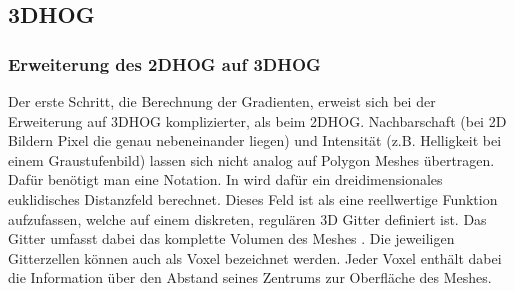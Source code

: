 

\subsection{3DHOG}


\subsubsection{Erweiterung des 2DHOG auf 3DHOG}
Der erste Schritt, die Berechnung der Gradienten, erweist sich bei der Erweiterung auf 3DHOG komplizierter, als beim 2DHOG. Nachbarschaft (bei 2D Bildern Pixel die genau nebeneinander liegen) und Intensität (z.B. Helligkeit bei einem Graustufenbild) lassen sich nicht analog auf Polygon Meshes übertragen. Dafür benötigt man eine Notation. In \cite{scherer2010histograms} wird dafür ein dreidimensionales euklidisches 
Distanzfeld berechnet. Dieses Feld ist als eine reellwertige Funktion aufzufassen, welche auf einem diskreten, regulären 3D Gitter definiert ist. Das Gitter umfasst dabei das komplette Volumen des Meshes \cite{scherer2010histograms}. Die jeweiligen Gitterzellen können auch als Voxel bezeichnet werden. Jeder Voxel enthält dabei die Information über den Abstand seines Zentrums zur Oberfläche des Meshes. 

